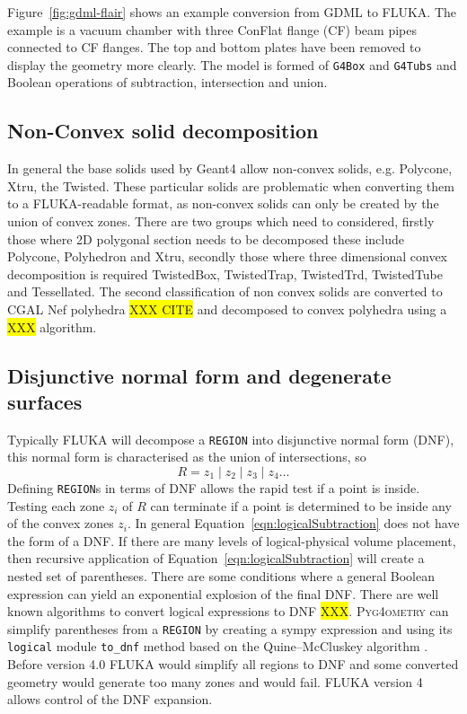 \documentclass[final,5p,times,twocolumn]{elsarticle}
\newcommand{\PYGEOMETRY}{\textsc{Pyg4ometry}}
\begin{document}
Figure~\ref{fig:gdml-flair} shows an example conversion from GDML to FLUKA. The example is a 
vacuum chamber with three ConFlat flange (CF) beam pipes connected to CF flanges. The top and bottom plates 
have been removed to display the geometry more clearly. The model is formed of \verb|G4Box| and
\verb|G4Tubs| and Boolean operations of subtraction, intersection and union.

\subsection{Non-Convex solid decomposition}
In general the base solids used by Geant4 allow non-convex solids, e.g. Polycone, Xtru, the Twisted.  These 
particular solids are problematic when converting them to a FLUKA-readable format, as non-convex solids 
can only be created by the union of convex zones. There are two groups which need to considered, firstly those 
where 2D polygonal section needs to be decomposed these include Polycone, Polyhedron and Xtru, secondly 
those where three dimensional convex decomposition is required  TwistedBox, TwistedTrap, TwistedTrd, 
TwistedTube and Tessellated. The second classification of non convex solids are converted to CGAL 
Nef polyhedra \colorbox{yellow}{XXX CITE} and decomposed to convex polyhedra using a 
\colorbox{yellow}{XXX} algorithm. 

\subsection{Disjunctive normal form and degenerate surfaces}
Typically FLUKA will decompose a \verb|REGION| into disjunctive normal form (DNF), this normal form is 
characterised as the union of intersections, so 
\begin{equation}
R = z_1 \; | \;z_2\;  | \; z_3 	\; | \; z_4 \dots
\end{equation}
Defining \verb|REGION|s in terms of DNF allows the rapid test if a point is inside. Testing each zone 
$z_i$ of $R$ can terminate if a point is determined to be inside any of the convex zones $z_i$. In general 
Equation~\ref{eqn:logicalSubtraction} does not have the form of a DNF. If there are many levels of logical-physical volume 
placement, then recursive application of  Equation~\ref{eqn:logicalSubtraction} will create a nested set of 
parentheses. There are some conditions where a general Boolean expression can yield an exponential 
explosion of the final DNF. There are well known algorithms to convert logical expressions to DNF 
\colorbox{yellow}{XXX}. \PYGEOMETRY{} can simplify parentheses from a \verb|REGION| by creating a 
sympy \cite{10.7717/peerj-cs.103} expression and using its \verb|logical| module \verb|to_dnf| method based on 
the Quine–McCluskey algorithm \cite{6769983}. Before version 4.0 FLUKA  would simplify all regions to 
DNF and some converted geometry would generate too many zones and would fail. FLUKA version 4 
allows control of the DNF expansion.
\end{document}
